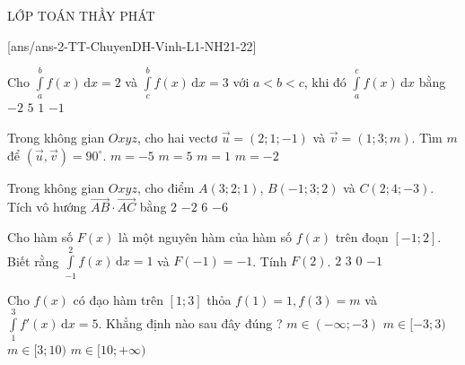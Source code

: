 \begin{name}
{\tenchude}{\tendethi}{LỚP TOÁN THẦY PHÁT}{\thoigian}
\end{name}

[ans/ans-2-TT-ChuyenDH-Vinh-L1-NH21-22]
\begin{ex}%
Cho $\displaystyle\int\limits_a^b f(x)\mathrm{\,d}x=2$ và $\displaystyle\int\limits_c^b f(x)\mathrm{\,d}x=3$ với $a<b<c$, khi đó $\displaystyle\int\limits_a^c f(x)\mathrm{\,d}x$ bằng
\choice
{$-2$}
{$5$}
{$1$}
{\True $-1$}
\end{ex}

\begin{ex}%
Trong không gian $Oxyz$, cho hai vectơ $\vec{u}=\left(2;1;-1\right)$ và $\vec{v}=\left(1;3;m\right)$. Tìm $m$ để $\left(\vec{u},\vec{v}\right)=90^\circ$.
\choice
{$m=-5$}
{\True $m=5$}
{$m=1$}
{$m=-2$}
\end{ex}

\begin{ex}%
Trong không gian $Oxyz$, cho điểm $A\left(3;2;1\right)$, $B\left(-1;3;2\right)$ và $C\left(2;4;-3\right)$. Tích vô hướng $\vec{AB}\cdot \vec{AC}$ bằng
\choice
{\True $2$}
{$-2$}
{$6$}
{$-6$}
\end{ex}

\begin{ex}%
Cho hàm số $F(x)$ là một nguyên hàm của hàm số $f(x)$ trên đoạn $[-1; 2]$. Biết rằng $\displaystyle\int\limits_{-1}^2 f(x)\mathrm{\,d}x=1$ và $F(-1)=-1$. Tính $F(2)$.
\choice
{$2$}
{$3$}
{\True $0$}
{$-1$}
\end{ex}

\begin{ex}%
Cho $f(x)$ có đạo hàm trên $[1; 3]$ thỏa $f(1)=1, f(3)=m$ và $\displaystyle\int\limits_1^3 f'(x)\mathrm{\,d}x=5$. Khẳng định nào sau đây đúng ?
\choice
{$m \in(-\infty; -3)$}
{$m \in[-3; 3)$}
{\True $m \in[3; 10)$}
{$m \in[10;+ \infty)$}
\loigiai{
Ta có $\displaystyle\int\limits_1^3 f'(x) \mathrm{\,d}x=f(x)\Big|_1^3=f(3)-f(1)=m-1$.\\
Suy ra $m-1=5\Leftrightarrow m=6\in [3;10)$.
}
\end{ex}

